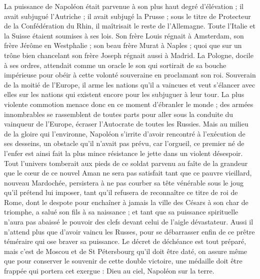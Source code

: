 La puissance de Napoléon était parvenue à son plus haut degré d'élévation ; il avait subjugué l'Autriche ; il avait subjugé la Prusse ; sous le titre de Protecteur de la Confédération du Rhin, il maîtrisait le reste de l'Allemagne. Toute l'Italie et la Suisse étaient soumises à ses lois. Son frère Louis régnait à Amsterdam,
son frère Jérôme en Westphalie ; son beau frère Murat à Naples ; quoi que sur un trône bien chancelant son frère Joseph régnait aussi à Madrid. La Pologne, docile à ses ordres, attendait comme un oracle le son qui sortirait de sa bouche impérieuse pour obéir à cette volonté souveraine en proclamant son roi. Souverain de la moitié de l'Europe, il arme les nations qu'il a vaincues et veut s'élancer avec elles sur les nations qui existent encore pour les subjuguer à leur tour. La plus violente commotion menace donc en ce moment d'ébranler le monde ; des armées innombrables se rassemblent de toutes parts pour aller sous la conduite du vainqueur de l'Europe, écraser l'Autocrate de toutes les Russies. Mais au milieu de la gloire qui l'environne, Napoléon s'irrite d'avoir rencontré à l'exécution de ses desseins, un obstacle qu'il n'avait pas prévu, car l'orgueil, ce premier né de l'enfer est ainsi fait la plus mince résistance le jette dans un violent désespoir. Tout l'univers tomberait aux pieds de ce soldat parvenu au faîte de la grandeur que le cœur de ce nouvel Aman ne sera pas satisfait tant que ce pauvre vieillard, nouveau Mardochée, persistera à ne pas courber sa tête vénérable sous le joug qu'il prétend lui imposer, tant qu'il refusera de reconnaître ce titre de roi de Rome, dont le despote pour enchaîner à jamais la ville des Césars à son char de triomphe, a salué son fils à sa naissance ; et tant que sa puissance spirituelle n’aura pas abaissé le pouvoir des clefs devant celui de l'aigle dévastateur. Aussi il n'attend plus que d'avoir vaincu les Russes, pour se débarrasser enfin de ce prêtre téméraire qui ose braver sa puissance. Le décret de déchéance est tout préparé, mais c'est de Moscou et de St Pétersbourg qu'il doit être daté, on assure même que pour conserver le souvenir de cette double
victoire, une médaille doit être frappée qui portera cet exergue : Dieu au ciel, Napoléon sur la terre.

